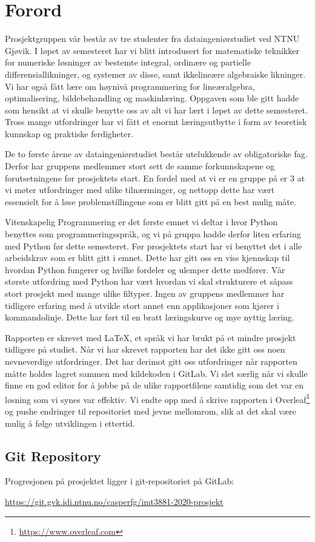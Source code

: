 \section*{Forord}
Prosjektgruppen vår består av tre studenter fra dataingeniørstudiet ved NTNU Gjøvik. I løpet av 
semesteret har vi blitt introdusert for matematiske teknikker for numeriske løsninger av bestemte 
integral, ordinære og partielle differensiallikninger, og systemer av disse, samt ikkelineære algebraiske likninger. Vi har også fått lære om høynivå programmering for lineæralgebra, optimalisering, bildebehandling og maskinlæring. Oppgaven som ble gitt hadde som hensikt at vi skulle benytte oss av alt vi har lært i løpet av dette semesteret. Tross mange utfordringer har vi fått et enormt læringsutbytte i form av teoretisk kunnskap og praktiske ferdigheter.

De to første årene av dataingeniørstudiet består utelukkende av obligatoriske fag. Derfor har gruppens medlemmer stort sett de samme forkunnskapene og forutsetningene før prosjektets start. En fordel med at vi er en gruppe på er 3 at vi møter utfordringer med ulike tilnærminger, og nettopp dette har vært essensielt for å løse problemstillingene som er blitt gitt på en best mulig måte.

Vitenskapelig Programmering er det første emnet vi deltar i hvor Python benyttes som programmeringsspråk, og vi på gruppa hadde derfor liten erfaring med Python før dette semesteret. Før prosjektets start har vi benyttet det i alle arbeidskrav som er blitt gitt i emnet. Dette har gitt oss en viss kjennskap til hvordan Python fungerer og hvilke fordeler og ulemper dette medfører. Vår største utfordring med Python har vært hvordan vi skal strukturere et såpass stort prosjekt med mange ulike filtyper. Ingen av gruppens medlemmer har tidligere erfaring med å utvikle stort annet enn applikasjoner som kjører i kommandolinje. Dette har  ført til en bratt læringskurve og mye nyttig læring.

Rapporten er skrevet med LaTeX, et språk vi har brukt på et mindre prosjekt tidligere på studiet. Når vi har skrevet rapporten har det ikke gitt oss noen nevneverdige utfordringer. Det har derimot gitt oss utfordringer når rapporten måtte holdes lagret sammen med kildekoden i GitLab. Vi slet særlig når vi skulle finne en god editor for å jobbe på de ulike rapportfilene samtidig som det var en løsning som vi synes var effektiv. Vi endte opp med å skrive rapporten i Overleaf\footnote{\url{https://www.overleaf.com}} og pushe endringer til repositoriet med jevne mellomrom, slik at det skal være mulig å følge utviklingen i ettertid.


\subsection*{Git Repository}
Progresjonen på prosjektet ligger i git-repositoriet på GitLab:

\url{https://git.gvk.idi.ntnu.no/casperfg/imt3881-2020-prosjekt}